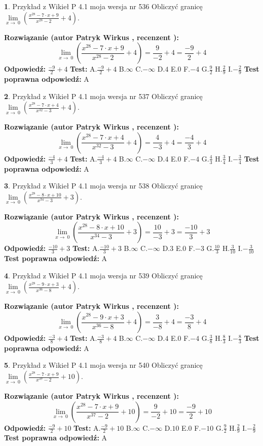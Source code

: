 \documentclass[12pt, a4paper]{article}
\theoremstyle{definition} %
\newtheorem{zad}{}
\newcommand{\zadStart}[1]{\begin{zad}#1\newline}
\newcommand{\zadStop}{\end{zad}}
\newcommand{\rozwStart}[2]{\noindent \textbf{Rozwiązanie (autor #1 , recenzent #2): }\newline}
\newcommand{\rozwStop}{\newline}
\newcommand{\odpStart}{\noindent \textbf{Odpowiedź:}\newline}
\newcommand{\odpStop}{\newline}
\newcommand{\testStart}{\noindent \textbf{Test:}\newline}
\newcommand{\testStop}{\newline}
\newcommand{\kluczStart}{\noindent \textbf{Test poprawna odpowiedź:}\newline}
\newcommand{\kluczStop}{\newline}
\begin{document}
\zadStart{Przykład z Wikieł P 4.1 moja wersja nr 536}
Obliczyć granicę $\lim\limits_{x\to\ 0}(\frac{x^{28}-7 \cdot x +9}{x^{28}-2}+4)$.
\zadStop
\rozwStart{Patryk Wirkus}{}
$$\lim\limits_{x\to\ 0}(\frac{x^{28}-7 \cdot x +9}{x^{28}-2}+4)=\frac{9}{-2}+4=\frac{-9}{2}+4$$
\rozwStop
\odpStart
$\frac{-9}{2}+4$
\odpStop
\testStart
A.$\frac{-9}{2}+4$
B.$\infty$
C.$-\infty$
D.$4$
E.$0$
F.$-4$
G.$\frac{9}{2}$
H.$\frac{2}{9}$
I.$-\frac{2}{9}$
\testStop
\kluczStart
A
\kluczStop



\zadStart{Przykład z Wikieł P 4.1 moja wersja nr 537}
Obliczyć granicę $\lim\limits_{x\to\ 0}(\frac{x^{28}-7 \cdot x +4}{x^{32}-3}+4)$.
\zadStop
\rozwStart{Patryk Wirkus}{}
$$\lim\limits_{x\to\ 0}(\frac{x^{28}-7 \cdot x +4}{x^{32}-3}+4)=\frac{4}{-3}+4=\frac{-4}{3}+4$$
\rozwStop
\odpStart
$\frac{-4}{3}+4$
\odpStop
\testStart
A.$\frac{-4}{3}+4$
B.$\infty$
C.$-\infty$
D.$4$
E.$0$
F.$-4$
G.$\frac{4}{3}$
H.$\frac{3}{4}$
I.$-\frac{3}{4}$
\testStop
\kluczStart
A
\kluczStop



\zadStart{Przykład z Wikieł P 4.1 moja wersja nr 538}
Obliczyć granicę $\lim\limits_{x\to\ 0}(\frac{x^{28}-8 \cdot x +10}{x^{34}-3}+3)$.
\zadStop
\rozwStart{Patryk Wirkus}{}
$$\lim\limits_{x\to\ 0}(\frac{x^{28}-8 \cdot x +10}{x^{34}-3}+3)=\frac{10}{-3}+3=\frac{-10}{3}+3$$
\rozwStop
\odpStart
$\frac{-10}{3}+3$
\odpStop
\testStart
A.$\frac{-10}{3}+3$
B.$\infty$
C.$-\infty$
D.$3$
E.$0$
F.$-3$
G.$\frac{10}{3}$
H.$\frac{3}{10}$
I.$-\frac{3}{10}$
\testStop
\kluczStart
A
\kluczStop



\zadStart{Przykład z Wikieł P 4.1 moja wersja nr 539}
Obliczyć granicę $\lim\limits_{x\to\ 0}(\frac{x^{28}-9 \cdot x +3}{x^{36}-8}+4)$.
\zadStop
\rozwStart{Patryk Wirkus}{}
$$\lim\limits_{x\to\ 0}(\frac{x^{28}-9 \cdot x +3}{x^{36}-8}+4)=\frac{3}{-8}+4=\frac{-3}{8}+4$$
\rozwStop
\odpStart
$\frac{-3}{8}+4$
\odpStop
\testStart
A.$\frac{-3}{8}+4$
B.$\infty$
C.$-\infty$
D.$4$
E.$0$
F.$-4$
G.$\frac{3}{8}$
H.$\frac{8}{3}$
I.$-\frac{8}{3}$
\testStop
\kluczStart
A
\kluczStop



\zadStart{Przykład z Wikieł P 4.1 moja wersja nr 540}
Obliczyć granicę $\lim\limits_{x\to\ 0}(\frac{x^{28}-7 \cdot x +9}{x^{37}-2}+10)$.
\zadStop
\rozwStart{Patryk Wirkus}{}
$$\lim\limits_{x\to\ 0}(\frac{x^{28}-7 \cdot x +9}{x^{37}-2}+10)=\frac{9}{-2}+10=\frac{-9}{2}+10$$
\rozwStop
\odpStart
$\frac{-9}{2}+10$
\odpStop
\testStart
A.$\frac{-9}{2}+10$
B.$\infty$
C.$-\infty$
D.$10$
E.$0$
F.$-10$
G.$\frac{9}{2}$
H.$\frac{2}{9}$
I.$-\frac{2}{9}$
\testStop
\kluczStart
A
\kluczStop
\end{document}
